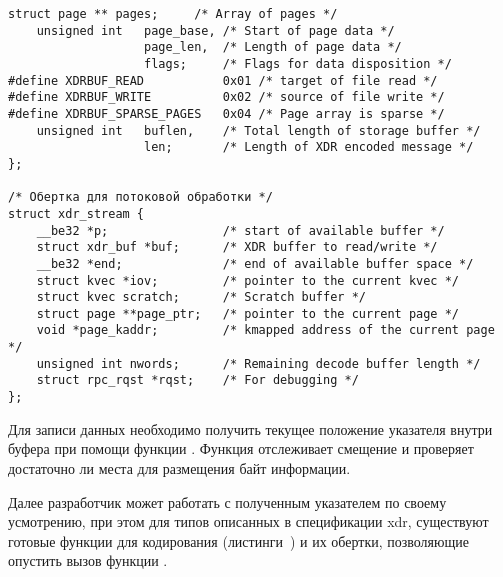 \begin{lstlisting}[caption={Структура буфера (часть 2)}, label={lst:xdr2}]
    struct page ** pages;     /* Array of pages */
    unsigned int   page_base, /* Start of page data */
                   page_len,  /* Length of page data */
                   flags;     /* Flags for data disposition */
#define XDRBUF_READ           0x01 /* target of file read */
#define XDRBUF_WRITE          0x02 /* source of file write */
#define XDRBUF_SPARSE_PAGES   0x04 /* Page array is sparse */
    unsigned int   buflen,    /* Total length of storage buffer */
                   len;       /* Length of XDR encoded message */
};

/* Обертка для потоковой обработки */
struct xdr_stream {
    __be32 *p;                /* start of available buffer */
    struct xdr_buf *buf;      /* XDR buffer to read/write */
    __be32 *end;              /* end of available buffer space */
    struct kvec *iov;         /* pointer to the current kvec */
    struct kvec scratch;      /* Scratch buffer */
    struct page **page_ptr;   /* pointer to the current page */
    void *page_kaddr;         /* kmapped address of the current page */
    unsigned int nwords;      /* Remaining decode buffer length */
    struct rpc_rqst *rqst;    /* For debugging */
};
\end{lstlisting}

Для записи данных необходимо получить текущее положение указателя внутри
буфера при помощи функции . Функция отслеживает
смещение и проверяет достаточно ли места для размещения 
байт информации.

Далее разработчик может работать с полученным указателем по своему усмотрению,
при этом для типов описанных в спецификации xdr, существуют готовые функции для
кодирования (листинги~) и их
обертки, позволяющие опустить вызов функции .

